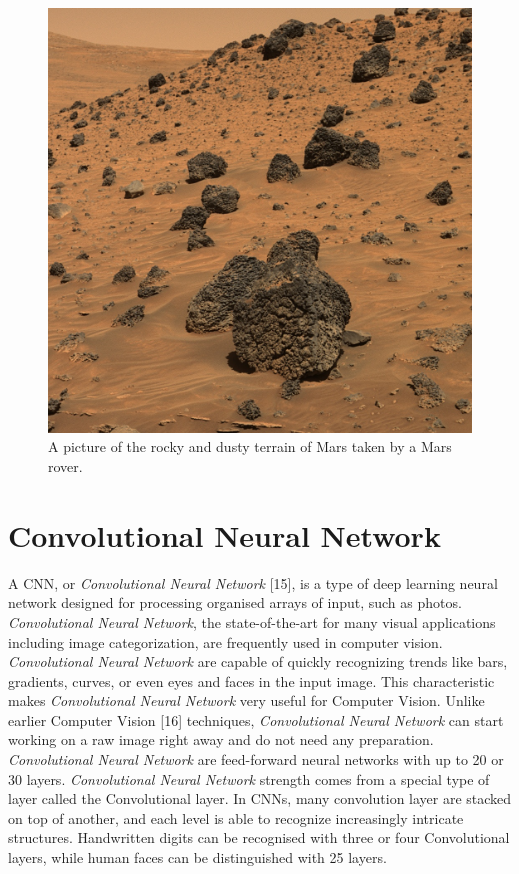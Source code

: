 \documentclass[conference]{IEEEtran}
\begin{document}
\begin{figure}[htbp]
\label{fig1}
\centerline{\includegraphics[width = \linewidth]{1}}
\caption{A picture of the rocky and dusty terrain of Mars taken by a Mars rover.}
\end{figure}
\section{Convolutional Neural Network}
A CNN, or \textit{Convolutional Neural Network} [15], is a type of deep learning neural network designed for processing organised arrays of input, such as photos. \textit{Convolutional Neural Network}, the state-of-the-art for many visual applications including image categorization, are frequently used in computer vision. \textit{Convolutional Neural Network} are capable of quickly recognizing trends like bars, gradients, curves, or even eyes and faces in the input image. This characteristic makes \textit{Convolutional Neural Network} very useful for Computer Vision. Unlike earlier Computer Vision [16] techniques, \textit{Convolutional Neural Network} can start working on a raw image right away and do not need any preparation. \textit{Convolutional Neural Network} are feed-forward neural networks with up to 20 or 30 layers. \textit{Convolutional Neural Network} strength comes from a special type of layer called the Convolutional layer. In CNNs, many convolution layer are stacked on top of another, and each level is able to recognize increasingly intricate structures. Handwritten digits can be recognised with three or four Convolutional layers, while human faces can be distinguished with 25 layers. \\
\end{document}
